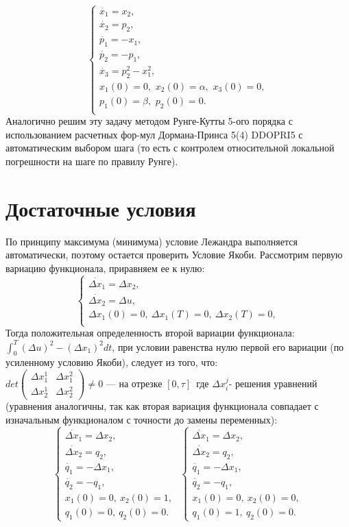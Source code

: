 \documentclass{article}
\theoremstyle{remark}
\theoremstyle{definition}
\begin{document}
$$
\begin{cases}
  \dot{x_1}=x_2,\\
  \dot{x_2}=p_2,\\
  \dot{p_1}=-x_1,\\
  \dot{p_2}=-p_1,\\
  \dot{x_3}=p_2^2-x_1^2,\\
  x_1(0)=0,\,\,x_2(0)=\alpha,\,\,x_3(0)=0,\\
  p_1(0)=\beta,\,\,p_2(0)=0.\\
 \end{cases} $$
 Аналогично решим эту задачу методом Рунге-Кутты 5-ого порядка с использованием расчетных фор-мул Дормана-Принса 5(4) DDOPRI5 с автоматическим выбором шага (то есть с контролем относительной локальной погрешности на шаге по правилу Рунге).
 \section{Достаточные условия}
 По принципу максимума (минимума) условие Лежандра выполняется автоматически, поэтому остается проверить Условие Якоби. Рассмотрим первую вариацию функционала, приравняем ее к нулю:
$$
\begin{cases}
\dot{\Delta x_1}=\Delta x_2,\\
\dot{\Delta x_2}=\Delta u,\\
\Delta x_1(0)=0,  \ \Delta x_1(T)=0,  \ \Delta x_2(T)=0, \\
\end{cases}
$$
Тогда положительная определенность второй вариации  функционала: $\int_0^T(\Delta u)^2-(\Delta x_1)^2 dt$,  при условии равенства нулю первой его вариации (по усиленному условию Якоби), следует из того, что:\\
$
det\left(
\begin{array}{cc}
    \Delta x_1^1 & \Delta x_1^2  \\
    \Delta x_2^1 & \Delta x_2^2
\end{array}\right)\neq0$ --- на отрезке $[0,\tau]$\, где $\Delta x_i^j$- решения уравнений (уравнения аналогичны, так как вторая вариация функционала совпадает с изначальным функционалом с точности до замены переменных):
$$
\begin{cases}
\dot{\Delta x_1}=\Delta x_2,\\
\dot{\Delta x_2}=q_2,\\
\dot{q_1}=-\Delta x_1,\\
\dot{q_2}=-q_1,\\
x_1(0)=0, \ x_2(0)=1, \\
q_1(0)=0, \ q_2(0)=0.
\end{cases}\,\,
\begin{cases}
\dot{\Delta x_1}=\Delta x_2,\\
\dot{\Delta x_2}=q_2,\\
\dot{q_1}=-\Delta x_1,\\
\dot{q_2}=-q_1,\\
x_1(0)=0, \ x_2(0)=0, \\
q_1(0)=1, \ q_2(0)=0.
\end{cases}
$$
\end{document}
